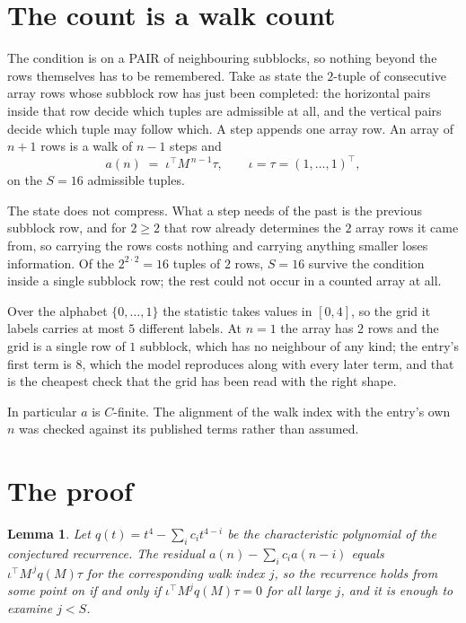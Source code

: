 \documentclass[11pt,a4paper]{article}
\theoremstyle{plain}
\newtheorem{lemma}[theorem]{Lemma}
\theoremstyle{definition}
\begin{document}
\section{The count is a walk count}

The condition is on a PAIR of neighbouring subblocks, so nothing beyond the
rows themselves has to be remembered. Take as state the $2$-tuple of consecutive array rows
whose subblock row has just been completed: the horizontal pairs inside that row decide which
tuples are admissible at all, and the vertical pairs decide which tuple may follow which. A
step appends one array row. An array of $n+1$ rows is a walk of $n-1$ steps and
\[
a(n)\;=\;\iota^{\!\top}M^{\,n-1}\tau,\qquad\iota=\tau=(1,\dots,1)^{\!\top},
\]
on the $S=16$ admissible tuples.

The state does not compress. What a step needs of the past is the previous subblock row, and
for $2\ge2$ that row already determines the $2$ array rows it came from, so carrying the
rows costs nothing and carrying anything smaller loses information. Of the $2^{2\cdot
2}=16$ tuples of $2$ rows, $S=16$ survive the condition inside a single subblock row;
the rest could not occur in a counted array at all.

Over the alphabet $\{0,\dots,1\}$ the statistic takes values in $[0,4]$, so the
grid it labels carries at most $5$ different labels. At $n=1$ the array has $2$
rows and the grid is a single row of $1$
subblock, which has no neighbour of any kind; the entry's first term is
$8$, which the model reproduces along with every later term, and that is the cheapest
check that the grid has been read with the right shape.

In particular $a$ is $C$-finite. The alignment of the walk index with the entry's own $n$ was
checked against its published terms rather than assumed.

\section{The proof}

\begin{lemma}\label{lem:crit}
Let $q(t)=t^{4}-\sum_i c_it^{4-i}$ be the characteristic polynomial of the
conjectured recurrence. The residual $a(n)-\sum_ic_ia(n-i)$ equals
$\iota^{\!\top}M^{\,j}q(M)\tau$ for the corresponding walk index $j$, so the recurrence
holds from some point on if and only if $\iota^{\!\top}M^{j}q(M)\tau=0$ for all large $j$,
and it is enough to examine $j<S$.
\end{lemma}
\end{document}

